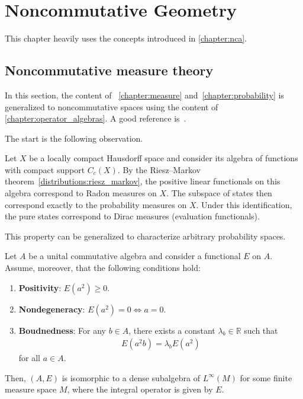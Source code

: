 \chapter{Noncommutative Geometry}\label{chapter:NCG}

    This chapter heavily uses the concepts introduced in \cref{chapter:nca}.

    \minitoc

\section{Noncommutative measure theory}\label{section:noncommutative_measure_theory}

    In this section, the content of ~\ref{chapter:measure} and~\ref{chapter:probability} is generalized to noncommutative spaces using the content of \cref{chapter:operator_algebras}. A good reference is~\citet{segal_algebraic_1965}.

    The start is the following observation.
    \begin{property}
        Let $X$ be a locally compact Hausdorff space and consider its algebra of functions with compact support $C_c(X)$. By the Riesz--Markov theorem~\ref{distributions:riesz_markov}, the positive linear functionals on this algebra correspond to Radon measures on $X$. The subspace of states then correspond exactly to the probability measures on $X$. Under this identification, the pure states correspond to Dirac measures (evaluation functionals).
    \end{property}

    This property can be generalized to characterize arbitrary probability spaces.
    \begin{property}\label{ncg:measure}
        Let $A$ be a unital commutative algebra and consider a functional $E$ on $A$. Assume, moreover, that the following conditions hold:
        \begin{enumerate}
            \item\textbf{Positivity}: $E(a^2)\geq0$.
            \item\textbf{Nondegeneracy}: $E(a^2)=0\iff a=0$.
            \item\textbf{Boudnedness}: For any $b\in A$, there exists a constant $\lambda_b\in\mathbb{R}$ such that
            \begin{gather}
                E(a^2b) = \lambda_bE(a^2)
            \end{gather}
            for all $a\in A$.
        \end{enumerate}
        Then, $(A,E)$ is isomorphic to a dense subalgebra of $L^\infty(M)$ for some finite measure space $M$, where the integral operator is given by $E$.
    \end{property}

